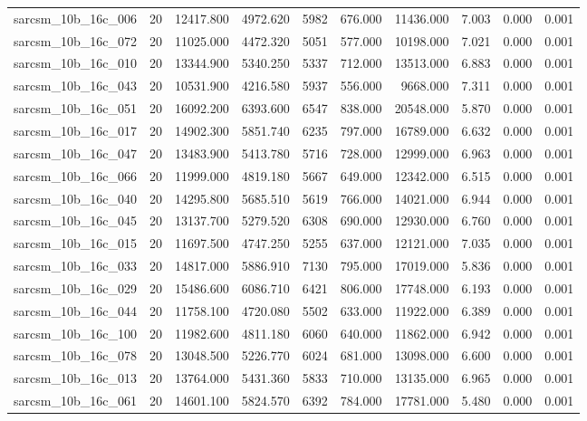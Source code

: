 \begin{tabular}{lrrrrrrrrr}
sarcsm\_10b\_16c\_006 & 20 & 12417.800 & 4972.620 & 5982 & 676.000 & 11436.000 & 7.003 & 0.000 & 0.001 \\
sarcsm\_10b\_16c\_072 & 20 & 11025.000 & 4472.320 & 5051 & 577.000 & 10198.000 & 7.021 & 0.000 & 0.001 \\
sarcsm\_10b\_16c\_010 & 20 & 13344.900 & 5340.250 & 5337 & 712.000 & 13513.000 & 6.883 & 0.000 & 0.001 \\
sarcsm\_10b\_16c\_043 & 20 & 10531.900 & 4216.580 & 5937 & 556.000 & 9668.000 & 7.311 & 0.000 & 0.001 \\
sarcsm\_10b\_16c\_051 & 20 & 16092.200 & 6393.600 & 6547 & 838.000 & 20548.000 & 5.870 & 0.000 & 0.001 \\
sarcsm\_10b\_16c\_017 & 20 & 14902.300 & 5851.740 & 6235 & 797.000 & 16789.000 & 6.632 & 0.000 & 0.001 \\
sarcsm\_10b\_16c\_047 & 20 & 13483.900 & 5413.780 & 5716 & 728.000 & 12999.000 & 6.963 & 0.000 & 0.001 \\
sarcsm\_10b\_16c\_066 & 20 & 11999.000 & 4819.180 & 5667 & 649.000 & 12342.000 & 6.515 & 0.000 & 0.001 \\
sarcsm\_10b\_16c\_040 & 20 & 14295.800 & 5685.510 & 5619 & 766.000 & 14021.000 & 6.944 & 0.000 & 0.001 \\
sarcsm\_10b\_16c\_045 & 20 & 13137.700 & 5279.520 & 6308 & 690.000 & 12930.000 & 6.760 & 0.000 & 0.001 \\
sarcsm\_10b\_16c\_015 & 20 & 11697.500 & 4747.250 & 5255 & 637.000 & 12121.000 & 7.035 & 0.000 & 0.001 \\
sarcsm\_10b\_16c\_033 & 20 & 14817.000 & 5886.910 & 7130 & 795.000 & 17019.000 & 5.836 & 0.000 & 0.001 \\
sarcsm\_10b\_16c\_029 & 20 & 15486.600 & 6086.710 & 6421 & 806.000 & 17748.000 & 6.193 & 0.000 & 0.001 \\
sarcsm\_10b\_16c\_044 & 20 & 11758.100 & 4720.080 & 5502 & 633.000 & 11922.000 & 6.389 & 0.000 & 0.001 \\
sarcsm\_10b\_16c\_100 & 20 & 11982.600 & 4811.180 & 6060 & 640.000 & 11862.000 & 6.942 & 0.000 & 0.001 \\
sarcsm\_10b\_16c\_078 & 20 & 13048.500 & 5226.770 & 6024 & 681.000 & 13098.000 & 6.600 & 0.000 & 0.001 \\
sarcsm\_10b\_16c\_013 & 20 & 13764.000 & 5431.360 & 5833 & 710.000 & 13135.000 & 6.965 & 0.000 & 0.001 \\
sarcsm\_10b\_16c\_061 & 20 & 14601.100 & 5824.570 & 6392 & 784.000 & 17781.000 & 5.480 & 0.000 & 0.001 \\

\end{tabular}
